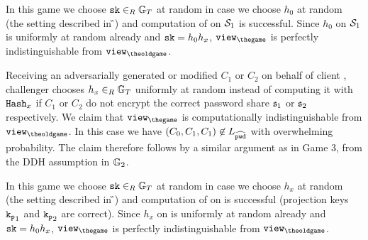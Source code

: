 

\Gh In this game we choose $\mathtt{sk}\in_R\mathbb{G}_T$ at random in case we choose $h_0$ at random (the setting described in \G{\theoldgame}) and computation of \sk on $\mathcal{S}_1$ is successful.
Since $h_0$ on $\mathcal{S}_1$ is uniformly at random already and $\mathtt{sk}=h_0h_x$, $\view_{\thegame}$ is perfectly indistinguishable from $\view_{\theoldgame}$.

\Gh Receiving an adversarially generated or modified $C_1$ or $C_2$ on behalf of client \Client, challenger \Challenger chooses $h_x\in_R\mathbb{G}_T$ uniformly at random instead of computing it with $\mathtt{Hash}_x$ if $C_1$ or $C_2$ do not encrypt the correct password share $\mathfrak{s}_1$ or $\mathfrak{s}_2$ respectively.
We claim that $\view_{\thegame}$ is computationally indistinguishable from $\view_{\theoldgame}$.
In this case we have $(C_0,C_1,C_1)\not\in L_{\widehat{\mathtt{pwd}}}$ with overwhelming probability.
The claim therefore follows by a similar argument as in Game 3, \ie from the \ac{DDH} assumption in $\mathbb{G}_2$.

\Gh In this game we choose $\mathtt{sk}\in_R\mathbb{G}_T$ at random in case we choose $h_x$ at random (the setting described in \G{\theoldgame}) and computation of \sk on \Client is successful (projection keys $\mathtt{k_p}_1$ and $\mathtt{k_p}_2$ are correct).
Since $h_x$ on \Client is uniformly at random already and $\mathtt{sk}=h_0h_x$, $\view_{\thegame}$ is perfectly indistinguishable from $\view_{\theoldgame}$.


